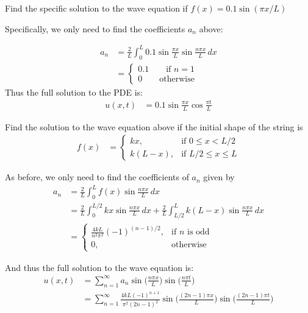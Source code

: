 \begin{example}
Find the specific solution to the wave equation if $f(x) = 0.1 \sin (\pi x/L)$

\solution

Specifically, we only need to find the coefficients $a_n$ above:

\begin{align*}
a_n & = \frac{2}{L} \int_0^L 0.1 \sin \frac{\pi x}{L}  \sin \frac{n\pi x}{L}  \, dx \\
& = \begin{cases}
0.1 \qquad \text{if $n=1$} \\
0 \qquad \text{otherwise} 
\end{cases}
\end{align*}
Thus the full solution to the PDE is:
%
\begin{align*}
u(x,t) & = 0.1 \sin \frac{\pi x}{L} \cos \frac{\pi t}{L} 
\end{align*}
\end{example}


\begin{example}
Find the solution to the wave equation above if the initial shape of the string is
% 
\begin{align*}
f(x) & = \begin{cases}
kx,&  \text{if $0\leq x< L/2$} \\
k(L-x),& \text{if $L/2 \leq x \leq L$} 
\end{cases}
\end{align*}

As before, we only need to find the coefficients of $a_n$ given by 
% 
\begin{align*}
a_n & = \frac{2}{L} \int_0^L  f(x)  \sin \frac{n \pi x}{L} \, dx \\
& = \frac{2}{L} \int_0^{L/2} kx \sin \frac{n \pi x}{L} \, dx + \frac{2}{L} \int_{L/2}^L k(L-x) \sin \frac{n \pi x}{L} \, dx \\
& = \begin{cases}
\frac{4k L}{n^2 \pi^2} (-1)^{(n-1)/2} , & \text{if $n$ is odd} \\
0, & \text{otherwise} 
\end{cases}
\end{align*}

And thus the full solution to the wave equation is:
% 
\begin{align*}
u(x,t) & = \sum_{n=1}^{\infty}a_n \sin \biggl(\frac{n \pi x}{L} \biggr) \sin \biggl(\frac{n \pi t}{L} \biggr)  \\
& = \sum_{n=1}^{\infty} \frac{4 k L (-1)^{n+1}}{\pi^2 (2n-1)^2} \sin \biggl( \frac{(2n-1) \pi x}{L} \biggr)   \sin \biggl(\frac{(2n-1) \pi t}{L} \biggr) 
\end{align*}
\end{example}

